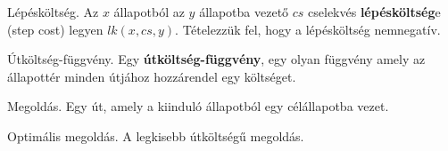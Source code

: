 \begin{definicio}
    Lépésköltség.
    Az $x$ állapotból az $y$ állapotba vezető $cs$ cselekvés
    \textbf{lépésköltség}e (step cost) legyen $lk(x, cs, y)$.  Tételezzük fel,
    hogy a lépésköltség nemnegatív.
\end{definicio}

\begin{definicio}
    Útköltség-függvény.
    Egy \textbf{útköltség-függvény}, egy olyan függvény amely az állapottér
    minden útjához hozzárendel egy költséget.
\end{definicio}

\begin{definicio}
    Megoldás.
    Egy út, amely a kiinduló állapotból egy célállapotba vezet.
\end{definicio}

\begin{definicio}
    Optimális megoldás.
    A legkisebb útköltségű megoldás.
\end{definicio}

